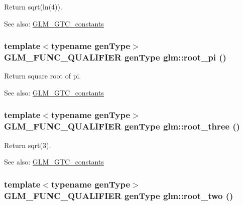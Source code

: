 Return sqrt(ln(4)). \begin{Desc}
\item[See also:]\hyperlink{group__gtc__constants}{GLM\_\-GTC\_\-constants} \end{Desc}
\hypertarget{group__gtc__constants_g94ccd058b697006c9aacc2329edc05a0}{
\subsubsection[root\_\-pi]{\setlength{\rightskip}{0pt plus 5cm}template$<$typename genType$>$ GLM\_\-FUNC\_\-QUALIFIER genType glm::root\_\-pi ()}}
\label{group__gtc__constants_g94ccd058b697006c9aacc2329edc05a0}


Return square root of pi. \begin{Desc}
\item[See also:]\hyperlink{group__gtc__constants}{GLM\_\-GTC\_\-constants} \end{Desc}
\hypertarget{group__gtc__constants_g2d2fec6ccd7b739e797e402521780fe3}{
\subsubsection[root\_\-three]{\setlength{\rightskip}{0pt plus 5cm}template$<$typename genType$>$ GLM\_\-FUNC\_\-QUALIFIER genType glm::root\_\-three ()}}
\label{group__gtc__constants_g2d2fec6ccd7b739e797e402521780fe3}


Return sqrt(3). \begin{Desc}
\item[See also:]\hyperlink{group__gtc__constants}{GLM\_\-GTC\_\-constants} \end{Desc}
\hypertarget{group__gtc__constants_g7e985cdcc68d42d833072d09cac683dc}{
\subsubsection[root\_\-two]{\setlength{\rightskip}{0pt plus 5cm}template$<$typename genType$>$ GLM\_\-FUNC\_\-QUALIFIER genType glm::root\_\-two ()}}
\label{group__gtc__constants_g7e985cdcc68d42d833072d09cac683dc}


